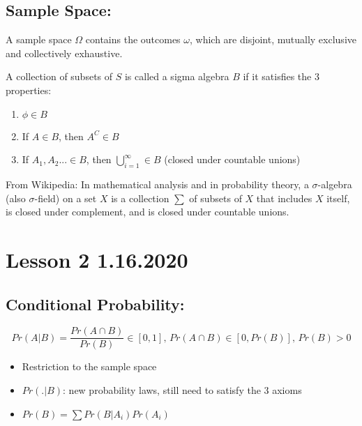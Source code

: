 \documentclass[11pt,letterpaper,titlepage]{article}
\begin{document}
\subsection{Sample Space:}

A sample space $\Omega$ contains the outcomes $\omega$, which are disjoint, mutually exclusive and collectively exhaustive.

A collection of subsets of $S$ is called a sigma algebra $B$ if it satisfies the 3 properties:

\begin{enumerate}

    \item $\phi \in B$
    
    \item If $A \in B$, then $A^C \in B$
    
    \item If $A_1, A_2... \in B$, then $\bigcup\limits_{i=1}^{\infty} \in B$ (closed under countable unions)
    
\end{enumerate}

From Wikipedia: In mathematical analysis and in probability theory, a $\sigma$-algebra (also $\sigma$-field) on a set $X$ is a collection $\sum$ of subsets of $X$ that includes $X$ itself, is closed under complement, and is closed under countable unions.

\newpage

\section{Lesson 2 1.16.2020}

\subsection{Conditional Probability:}

\begin{equation*}
    Pr(A|B) = \frac{Pr(A\cap B)}{Pr(B)} \in [0, 1] \text{, } Pr(A\cap B) \in [0, Pr(B)] \text{, } Pr(B) > 0
\end{equation*}

\begin{itemize}

    \item Restriction to the sample space
    
    \item $Pr(.|B)$: new probability laws, still need to satisfy the 3 axioms
    
    \item $Pr(B) = \sum Pr(B|A_i)Pr(A_i)$
    
\end{itemize}
\end{document}
